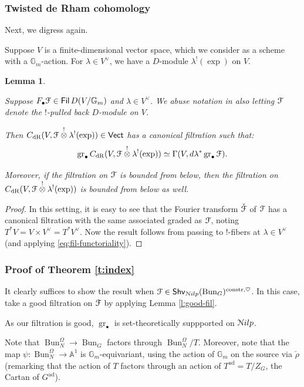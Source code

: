 \documentclass[reqno,11pt]{amsart}
\numberwithin{equation}{subsection}
\newtheorem{lem}[thm]{Lemma}
\theoremstyle{remark}
\newcommand{\bA}{{\mathbb A}}
\newcommand{\bG}{{\mathbb G}}
\newcommand{\sF}{{\EuScript F}}
\newcommand{\sN}{{\EuScript N}}
\newcommand{\on}{\operatorname}
\newcommand{\ad}{\on{ad}}
\newcommand{\gr}{\on{gr}}
\renewcommand{\dot}{\bullet}
\newcommand{\Vect}{\mathsf{Vect}}
\newcommand{\Fil}{\mathsf{Fil}\,}
\newcommand{\fil}{F}
\newcommand{\Bun}{\on{Bun}}
\newcommand{\heart}{\heartsuit}
\newcommand{\Shv}{\mathsf{Shv}}
\newcommand{\Nilp}{\sN ilp}
\newcommand{\constr}{\on{constr}}
\newcommand{\dR}{\on{dR}}
\begin{document}
\subsubsection{Twisted de Rham cohomology}

Next, we digress again. 

Suppose $V$ is a finite-dimensional vector space, which 
we consider as a scheme with a $\bG_m$-action.
For $\lambda \in V^{\vee}$, we have a $D$-module
$\lambda^!(\exp)$ on $V$.

\begin{lem}\label{l:exp-g_m}

Suppose $\fil_{\dot} \sF \in \Fil D(V/\bG_m)$ and $\lambda \in V^{\vee}$. 
We abuse notation in also letting $\sF$ denote the $!$-pulled back
$D$-module on $V$. 

Then $C_{\dR}(V,\sF \overset{!}{\otimes} \lambda^!(\exp)) \in \Vect$
has a canonical filtration such that:
%
\[
\gr_{\dot} C_{\dR}(V,\sF \overset{!}{\otimes} \lambda^!(\exp)) \simeq
\Gamma(V,d\lambda^*\gr_{\dot} \sF).
\]

Moreover, if the filtration on $\sF$ is bounded from below, 
then the filtration on $C_{\dR}(V,\sF \overset{!}{\otimes} \lambda^!(\exp))$
is bounded from below as well.

\end{lem}

\begin{proof}

In this setting, it is easy to see that the Fourier transform $\check{\sF}$ of
$\sF$ has a canonical filtration with the same associated graded
as $\sF$, noting $T^*V = V \times V^{\vee} = T^*V^{\vee}$.
Now the result follows from passing to $!$-fibers at $\lambda \in V^{\vee}$
(and applying \eqref{eq:fil-functoriality}).

\end{proof}

\subsubsection{Proof of Theorem \ref{t:index}}

It clearly suffices to show the result when 
$\sF \in \Shv_{\Nilp}(\Bun_G)^{\constr,\heart}$.
In this case, take a good filtration on $\sF$ by applying Lemma \ref{l:good-fil}.

As our filtration is good, $\gr_{\dot}$ is set-theoretically suppported
on $\Nilp$. 

Note that $\Bun_N^{\Omega} \to \Bun_G$ factors through 
$\Bun_N^{\Omega}/T$. Moreover, note that the map
$\psi:\Bun_N^{\Omega} \to \bA^1$ is $\bG_m$-equivariant,
using the action of $\bG_m$ on the source via 
$\check{\rho}$ (remarking that the action of $T$ factors through
an action of $T^{\on{ad}} = T/Z_G$, the Cartan of $G^{\ad}$). 
\end{document}
